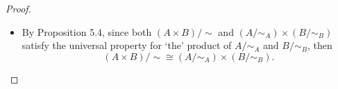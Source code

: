 \documentclass{article}
\theoremstyle{definition}
\begin{document}
\begin{proof}
\begin{itemize}
		      Given $z \in Z$, choose $\alpha \in f(z)$ and $\beta \in g(z)$.
		      Then define $h$ by $h(z) = [(\alpha, \beta)]_{\sim}$.
		      It is clear that if this is well-defined, then the diagram commutes, so we simply need to show that this is well-defined.
		      Indeed, given some other $\alpha_1 \in f(z)$ and $\beta_1 \in g(z)$, we have $\alpha \sim_A \alpha_1$ and $\beta \sim_B \beta_1$, so by definition $(\alpha, \beta) \sim (\alpha_1, \beta_1)$, meaning $[(\alpha, \beta)]_{\sim} = [(\alpha_1, \beta_1)]_{\sim}$.

		      To show that this is unique, simply assume that $h_1(z) = [(\alpha_2, \beta_2)]_\sim$ where $(\alpha_2, \beta_2) \nsim (\alpha, \beta)$, so either $\alpha_2 \nsim_A \alpha$ or $\beta_2 \nsim_B \beta$.
		      Without loss of generality, assume $\alpha_2 \nsim_A \alpha$.
		      Then \begin{equation*}
			      \varphi(h_1(z)) = [\alpha_2]_{\sim_A} \neq [\alpha]_{\sim_A} = f(z),
		      \end{equation*}
		      so the diagram does not commute.
		\item By Proposition 5.4, since both $(A \times B)/{\sim}$ and $(A/{\sim_A}) \times (B/{\sim_B})$ satisfy the universal property for `the' product of $A/{\sim_A}$ and $B/{\sim_B}$, then \begin{equation*}
			      (A \times B)/{\sim} \cong (A/{\sim_A}) \times (B/{\sim_B}).
		      \end{equation*}
	\end{itemize}
\end{proof}
\end{document}
